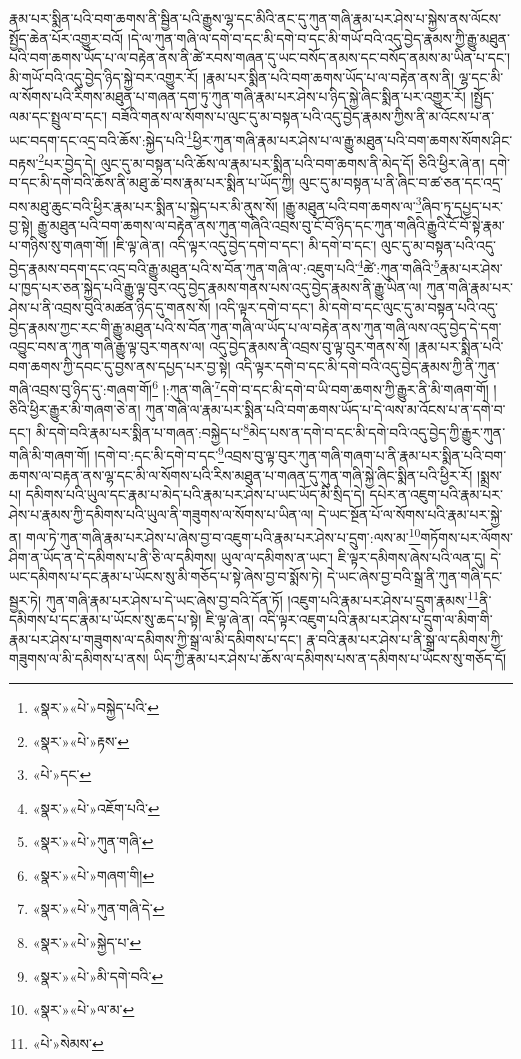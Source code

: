 རྣམ་པར་སྨིན་པའི་བག་ཆགས་ནི་སྦྱིན་པའི་རྒྱུས་ལྷ་དང་མིའི་ནང་དུ་ཀུན་གཞི་རྣམ་པར་ཤེས་པ་སྐྱེས་ནས་ལོངས་སྤྱོད་ཆེན་པོར་འགྱུར་བའོ། །དེ་ལ་ཀུན་གཞི་ལ་དགེ་བ་དང་མི་དགེ་བ་དང་མི་གཡོ་བའི་འདུ་བྱེད་རྣམས་ཀྱི་རྒྱུ་མཐུན་པའི་བག་ཆགས་ཡོད་པ་ལ་བརྟེན་ནས་ནི་ཚེ་རབས་གཞན་དུ་ཡང་བསོད་ནམས་དང་བསོད་ནམས་མ་ཡིན་པ་དང་། མི་གཡོ་བའི་འདུ་བྱེད་ཉིད་སྐྱེ་བར་འགྱུར་རོ། །རྣམ་པར་སྨིན་པའི་བག་ཆགས་ཡོད་པ་ལ་བརྟེན་ནས་ནི། ལྷ་དང་མི་ལ་སོགས་པའི་རིགས་མཐུན་པ་གཞན་དག་ཏུ་ཀུན་གཞི་རྣམ་པར་ཤེས་པ་ཉིད་སྐྱེ་ཞིང་སྨིན་པར་འགྱུར་རོ། །སྤྱོད་ལམ་དང་སྤྲུལ་བ་དང་། བཟོའི་གནས་ལ་སོགས་པ་ལུང་དུ་མ་བསྟན་པའི་འདུ་བྱེད་རྣམས་ཀྱིས་ནི་མ་འོངས་པ་ན་ཡང་བདག་དང་འདྲ་བའི་ཆོས་:སྐྱེད་པའི་\footnote{«སྣར་»«པེ་»བསྐྱེད་པའི་}ཕྱིར་ཀུན་གཞི་རྣམ་པར་ཤེས་པ་ལ་རྒྱུ་མཐུན་པའི་བག་ཆགས་སོགས་ཤིང་བརྟས་\footnote{«སྣར་»«པེ་»རྟས་}པར་བྱེད་དེ། ལུང་དུ་མ་བསྟན་པའི་ཆོས་ལ་རྣམ་པར་སྨིན་པའི་བག་ཆགས་ནི་མེད་དོ། ཅིའི་ཕྱིར་ཞེ་ན། དགེ་བ་དང་མི་དགེ་བའི་ཆོས་ནི་མཐུ་ཆེ་བས་རྣམ་པར་སྨིན་པ་ཡོད་ཀྱི། ལུང་དུ་མ་བསྟན་པ་ནི་ཞིང་བ་ཚ་ཅན་དང་འདྲ་བས་མཐུ་ཆུང་བའི་ཕྱིར་རྣམ་པར་སྨིན་པ་སྐྱེད་པར་མི་ནུས་སོ། །རྒྱུ་མཐུན་པའི་བག་ཆགས་ལ་\footnote{«པེ་»དང་}ཞིབ་ཏུ་དཔྱད་པར་བྱ་སྟེ། རྒྱུ་མཐུན་པའི་བག་ཆགས་ལ་བརྟེན་ནས་ཀུན་གཞིའི་འབྲས་བུ་ངོ་བོ་ཉིད་དང་ཀུན་གཞིའི་རྒྱུའི་ངོ་བོ་སྟེ་རྣམ་པ་གཉིས་སུ་གཞག་གོ། །ཇི་ལྟ་ཞེ་ན། འདི་ལྟར་འདུ་བྱེད་དགེ་བ་དང་། མི་དགེ་བ་དང་། ལུང་དུ་མ་བསྟན་པའི་འདུ་བྱེད་རྣམས་བདག་དང་འདྲ་བའི་རྒྱུ་མཐུན་པའི་ས་བོན་ཀུན་གཞི་ལ་:འཇུག་པའི་\footnote{«སྣར་»«པེ་»འཇོག་པའི་}ཚེ་:ཀུན་གཞིའི་\footnote{«སྣར་»«པེ་»ཀུན་གཞི་}རྣམ་པར་ཤེས་པ་ཁྱད་པར་ཅན་སྐྱེད་པའི་རྒྱུ་ལྟ་བུར་འདུ་བྱེད་རྣམས་གནས་པས་འདུ་བྱེད་རྣམས་ནི་རྒྱུ་ཡིན་ལ། ཀུན་གཞི་རྣམ་པར་ཤེས་པ་ནི་འབྲས་བུའི་མཚན་ཉིད་དུ་གནས་སོ། །འདི་ལྟར་དགེ་བ་དང་། མི་དགེ་བ་དང་ལུང་དུ་མ་བསྟན་པའི་འདུ་བྱེད་རྣམས་ཀྱང་རང་གི་རྒྱུ་མཐུན་པའི་ས་བོན་ཀུན་གཞི་ལ་ཡོད་པ་ལ་བརྟེན་ནས་ཀུན་གཞི་ལས་འདུ་བྱེད་དེ་དག་འབྱུང་བས་ན་ཀུན་གཞི་རྒྱུ་ལྟ་བུར་གནས་ལ། འདུ་བྱེད་རྣམས་ནི་འབྲས་བུ་ལྟ་བུར་གནས་སོ། །རྣམ་པར་སྨིན་པའི་བག་ཆགས་ཀྱི་དབང་དུ་བྱས་ནས་དཔྱད་པར་བྱ་སྟེ། འདི་ལྟར་དགེ་བ་དང་མི་དགེ་བའི་འདུ་བྱེད་རྣམས་ཀྱི་ནི་ཀུན་གཞི་འབྲས་བུ་ཉིད་དུ་:གཞག་གོ།\footnote{«སྣར་»«པེ་»གཞག་གི།} །:ཀུན་གཞི་\footnote{«སྣར་»«པེ་»ཀུན་གཞི་དེ་}དགེ་བ་དང་མི་དགེ་བ་ཡི་བག་ཆགས་ཀྱི་རྒྱུར་ནི་མི་གཞག་གོ། །ཅིའི་ཕྱིར་རྒྱུར་མི་གཞག་ཅེ་ན། ཀུན་གཞི་ལ་རྣམ་པར་སྨིན་པའི་བག་ཆགས་ཡོད་པ་དེ་ལས་མ་འོངས་པ་ན་དགེ་བ་དང་། མི་དགེ་བའི་རྣམ་པར་སྨིན་པ་གཞན་:བསྐྱེད་པ་\footnote{«སྣར་»«པེ་»སྐྱེད་པ་}མེད་པས་ན་དགེ་བ་དང་མི་དགེ་བའི་འདུ་བྱེད་ཀྱི་རྒྱུར་ཀུན་གཞི་མི་གཞག་གོ། །དགེ་བ་:དང་མི་དགེ་བ་དང་\footnote{«སྣར་»«པེ་»མི་དགེ་བའི་}འབྲས་བུ་ལྟ་བུར་ཀུན་གཞི་གཞག་པ་ནི་རྣམ་པར་སྨིན་པའི་བག་ཆགས་ལ་བརྟན་ནས་ལྷ་དང་མི་ལ་སོགས་པའི་རིས་མཐུན་པ་གཞན་དུ་ཀུན་གཞི་སྐྱེ་ཞིང་སྨིན་པའི་ཕྱིར་རོ། །སྨྲས་པ། དམིགས་པའི་ཡུལ་དང་རྣམ་པ་མེད་པའི་རྣམ་པར་ཤེས་པ་ཡང་ཡོད་མི་སྲིད་དེ། དཔེར་ན་འཇུག་པའི་རྣམ་པར་ཤེས་པ་རྣམས་ཀྱི་དམིགས་པའི་ཡུལ་ནི་གཟུགས་ལ་སོགས་པ་ཡིན་ལ། དེ་ཡང་སྔོན་པོ་ལ་སོགས་པའི་རྣམ་པར་སྐྱེ་ན། གལ་ཏེ་ཀུན་གཞི་རྣམ་པར་ཤེས་པ་ཞེས་བྱ་བ་འཇུག་པའི་རྣམ་པར་ཤེས་པ་དྲུག་:ལས་མ་\footnote{«སྣར་»«པེ་»ལ་མ་}གཏོགས་པར་ལོགས་ཤིག་ན་ཡོད་ན་དེ་དམིགས་པ་ནི་ཅི་ལ་དམིགས། ཡུལ་ལ་དམིགས་ན་ཡང་། ཇི་ལྟར་དམིགས་ཞེས་པའི་ལན་དུ། དེ་ཡང་དམིགས་པ་དང་རྣམ་པ་ཡོངས་སུ་མི་གཅོད་པ་སྟེ་ཞེས་བྱ་བ་སྨོས་ཏེ། དེ་ཡང་ཞེས་བྱ་བའི་སྒྲ་ནི་ཀུན་གཞི་དང་སྦྱར་ཏེ། ཀུན་གཞི་རྣམ་པར་ཤེས་པ་དེ་ཡང་ཞེས་བྱ་བའི་དོན་ཏོ། །འཇུག་པའི་རྣམ་པར་ཤེས་པ་དྲུག་རྣམས་\footnote{«པེ་»སེམས་}ནི་དམིགས་པ་དང་རྣམ་པ་ཡོངས་སུ་ཆད་པ་སྟེ། ཇི་ལྟ་ཞེ་ན། འདི་ལྟར་འཇུག་པའི་རྣམ་པར་ཤེས་པ་དྲུག་ལ་མིག་གི་རྣམ་པར་ཤེས་པ་གཟུགས་ལ་དམིགས་ཀྱི་སྒྲ་ལ་མི་དམིགས་པ་དང་། རྣ་བའི་རྣམ་པར་ཤེས་པ་ནི་སྒྲ་ལ་དམིགས་ཀྱི་གཟུགས་ལ་མི་དམིགས་པ་ནས། ཡིད་ཀྱི་རྣམ་པར་ཤེས་པ་ཆོས་ལ་དམིགས་པས་ན་དམིགས་པ་ཡོངས་སུ་གཅོད་དོ། 